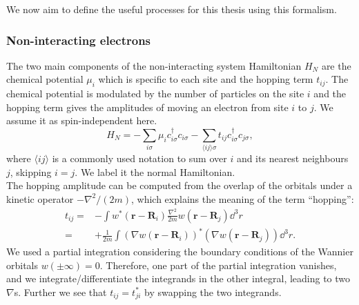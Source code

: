 \documentclass[../main.tex]{subfile}
\begin{document}
We now aim to define the useful processes for this thesis using this formalism.

\subsubsection{Non-interacting electrons}
The two main components of the non-interacting system Hamiltonian $H_N$ are the chemical potential $\mu_i$ which is specific to each site and the hopping term $t_{ij}$.
The chemical potential is modulated by the number of particles on the site $i$ and the hopping term gives the amplitudes of moving an electron from site $i$ to $j$.
We assume it as spin-independent here.\\
\begin{equation}\label{eq:Ham_Normal}
    H_N = - \sum_{i \sigma} \mu_i c_{i\sigma}^{\dagger} c_{i\sigma} - \sum_{\langle ij\rangle \sigma} t_{ij} c_{i\sigma}^{\dagger} c_{j\sigma},
\end{equation}
where $\langle ij\rangle$ is a commonly used notation to sum over $i$ and its nearest neighbours $j$, skipping $i=j$. We label it the normal
Hamiltonian.\\

The hopping amplitude can be computed from the overlap of the orbitals under a kinetic operator $-\nabla^2/(2m)$, which explains the meaning of the term ``hopping'':
\begin{align*}
    t_{ij} =& -\int w^{\ast}(\bm{r} - \bm{R}_i) \frac{\nabla^2}{2m} w(\bm{r} - \bm{R}_j) \dd^3r\\
           =& +\frac{1}{2m}\int \left(\nabla w(\bm{r} - \bm{R}_i)\right)^{\ast} \left(\nabla w(\bm{r} - \bm{R}_j)\right) \dd^3r.
\end{align*}
We used a partial integration considering the boundary conditions of the Wannier orbitals $w(\pm \infty) = 0$. Therefore, one part of the partial integration vanishes,
and we integrate/differentiate the integrands in the other integral, leading to two $\nabla$s. Further we see that $t_{ij} = t_{ji}^{\ast}$ by swapping the two integrands.\\
\end{document}

